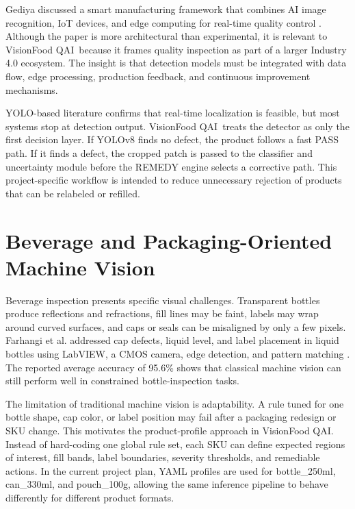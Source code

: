 \documentclass[12pt,a4paper]{report}
\newcommand{\shorttitle}{VisionFood QAI}
\begin{document}
Gediya discussed a smart manufacturing framework that combines AI image recognition, IoT devices, and edge computing for real-time quality control \cite{gediya2024smart}. Although the paper is more architectural than experimental, it is relevant to \shorttitle\ because it frames quality inspection as part of a larger Industry 4.0 ecosystem. The insight is that detection models must be integrated with data flow, edge processing, production feedback, and continuous improvement mechanisms.

YOLO-based literature confirms that real-time localization is feasible, but most systems stop at detection output. \shorttitle\ treats the detector as only the first decision layer. If YOLOv8 finds no defect, the product follows a fast PASS path. If it finds a defect, the cropped patch is passed to the classifier and uncertainty module before the REMEDY engine selects a corrective path. This project-specific workflow is intended to reduce unnecessary rejection of products that can be relabeled or refilled.

\section{Beverage and Packaging-Oriented Machine Vision}
\label{sec:beverage-packaging}

Beverage inspection presents specific visual challenges. Transparent bottles produce reflections and refractions, fill lines may be faint, labels may wrap around curved surfaces, and caps or seals can be misaligned by only a few pixels. Farhangi et al. addressed cap defects, liquid level, and label placement in liquid bottles using LabVIEW, a CMOS camera, edge detection, and pattern matching \cite{farhangi2024machine}. The reported average accuracy of 95.6\% shows that classical machine vision can still perform well in constrained bottle-inspection tasks.

The limitation of traditional machine vision is adaptability. A rule tuned for one bottle shape, cap color, or label position may fail after a packaging redesign or SKU change. This motivates the product-profile approach in \shorttitle. Instead of hard-coding one global rule set, each SKU can define expected regions of interest, fill bands, label boundaries, severity thresholds, and remediable actions. In the current project plan, YAML profiles are used for bottle\_250ml, can\_330ml, and pouch\_100g, allowing the same inference pipeline to behave differently for different product formats.
\end{document}
